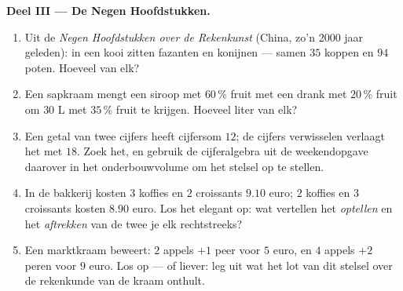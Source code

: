 \begin{problem}
\medskip
\noindent\textbf{Deel III --- De Negen Hoofdstukken.}
\begin{enumerate}[resume]
  \item Uit de \emph{Negen Hoofdstukken over de Rekenkunst} (China, zo'n 2000
        jaar geleden): in een kooi zitten fazanten en konijnen --- samen $35$
        koppen en $94$ poten. Hoeveel van elk?
  \item Een sapkraam mengt een siroop met $60\,\%$ fruit met een drank met
        $20\,\%$ fruit om $30$ L met $35\,\%$ fruit te krijgen. Hoeveel liter
        van elk?
  \item Een getal van twee cijfers heeft cijfersom $12$; de cijfers verwisselen
        verlaagt het met $18$. Zoek het, en gebruik de cijferalgebra uit de
        weekendopgave daarover in het onderbouwvolume om het stelsel op te
        stellen.
  \item In de bakkerij kosten $3$ koffies en $2$ croissants $9.10$ euro; $2$
        koffies en $3$ croissants kosten $8.90$ euro. Los het elegant op: wat
        vertellen het \emph{optellen} en het \emph{aftrekken} van de twee
         je elk rechtstreeks?
  \item Een marktkraam beweert: $2$ appels $+ 1$ peer voor $5$ euro, en $4$
        appels $+ 2$ peren voor $9$ euro. Los op --- of liever: leg uit wat
        het lot van dit stelsel over de rekenkunde van de kraam onthult.
\end{enumerate}


\end{problem}
